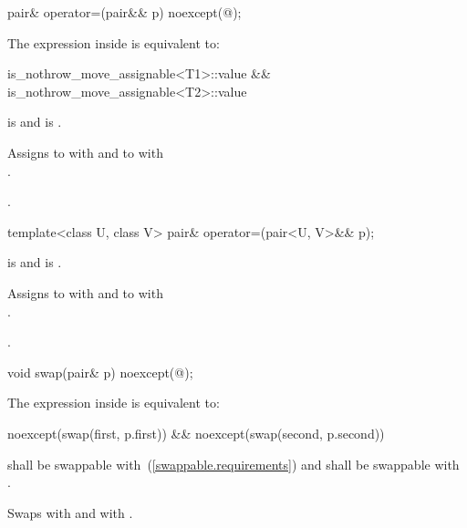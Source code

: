\begin{itemdecl}
pair& operator=(pair&& p) noexcept(@\seebelow@);
\end{itemdecl}

\begin{itemdescr}
\pnum
\remarks The expression inside  is equivalent to:

\begin{codeblock}
is_nothrow_move_assignable<T1>::value &&
is_nothrow_move_assignable<T2>::value
\end{codeblock}

\pnum
\requires {} is 
and  is .

\pnum
\effects
Assigns to  with 
and to  with\\ .

\pnum
\returns {}.
\end{itemdescr}

\begin{itemdecl}
template<class U, class V> pair& operator=(pair<U, V>&& p);
\end{itemdecl}

\begin{itemdescr}
\pnum
\requires {} is 
and  is .

\pnum
\effects
Assigns to  with 
and to  with\\ .

\pnum
\returns {}.
\end{itemdescr}

\begin{itemdecl}
void swap(pair& p) noexcept(@\seebelow@);
\end{itemdecl}

\begin{itemdescr}
\pnum
\remarks The expression inside  is equivalent to:

\begin{codeblock}
noexcept(swap(first, p.first)) &&
noexcept(swap(second, p.second))
\end{codeblock}

\pnum
\requires
{} shall be swappable with~(\ref{swappable.requirements})
 and  shall be swappable with .

\pnum
\effects Swaps
 with  and
 with .
\end{itemdescr}

